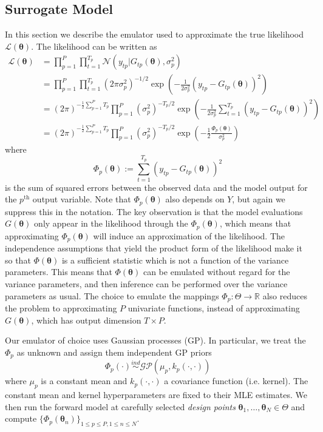 \documentclass[12pt]{article}
\newcommand{\R}{\mathbb{R}}
\newcommand{\btheta}{\boldsymbol{\theta}}
\begin{document}
\subsection{Surrogate Model}
In this section we describe the emulator used to approximate the true likelihood $\mathcal{L}(\btheta)$. The likelihood can be written as 
\begin{align*}
\mathcal{L}(\btheta) &= \prod_{p = 1}^{P} \prod_{t = 1}^{T_p} \mathcal{N}\left(y_{tp}| G_{tp}(\btheta), \sigma_p^2 \right) \\
			       &= \prod_{p = 1}^{P}  \prod_{t = 1}^{T_p} (2\pi \sigma_p^2)^{-1/2} \exp\left(-\frac{1}{2\sigma_p^2} (y_{tp} - G_{tp}(\btheta))^2 \right) \\
			       &= (2\pi)^{-\frac{1}{2} \sum_{p = 1}^{P} T_p}  \prod_{p = 1}^{P}  (\sigma_p^2)^{-T_p/2} \exp\left(-\frac{1}{2\sigma_p^2} \sum_{t = 1}^{T_p} (y_{tp} - G_{tp}(\btheta))^2  \right) \\
			       &= (2\pi)^{-\frac{1}{2} \sum_{p = 1}^{P} T_p}  \prod_{p = 1}^{P}  (\sigma_p^2)^{-T_p/2} \exp\left(-\frac{1}{2} \frac{\Phi_p(\btheta)}{\sigma_p^2} \right)
\end{align*}
where 
\[\Phi_p(\btheta) := \sum_{t = 1}^{T_p} (y_{tp} - G_{tp}(\btheta))^2\]
is the sum of squared errors between the observed data and the model output for the $p^{\text{th}}$ output variable. Note that $\Phi_p(\btheta)$ also depends on $Y$, but again we suppress this in the notation. The key observation 
is that the model evaluations $G(\btheta)$ only appear in the likelihood through the $\Phi_p(\btheta)$, which means that approximating $\Phi_p(\btheta)$ will induce an approximation of the likelihood. The independence assumptions 
that yield the product form of the likelihood make it so that $\Phi(\btheta)$ is a sufficient statistic which is not a function of the variance parameters. This means that $\Phi(\btheta)$ can be emulated without regard for the variance parameters, 
and then inference can be performed over the variance parameters as usual. The choice to emulate the mappings $\Phi_p: \Theta \to \R$ also reduces the problem to 
approximating $P$ univariate functions, instead of approximating $G(\btheta)$, which has output dimension $T \times P$. 

Our emulator of choice uses Gaussian processes (GP). In particular, we treat the $\Phi_p$ as unknown and assign them independent GP priors
\[\Phi_p(\cdot) \overset{ind}{\sim} \mathcal{GP}(\mu_p, k_p(\cdot, \cdot))\] 
where $\mu_p$ is a constant mean and $k_p(\cdot, \cdot)$ a covariance function (i.e. kernel). The constant mean and kernel hyperparameters are fixed to their MLE estimates. We then run the forward model at carefully selected 
\textit{design points} $\btheta_1, \dots, \btheta_N \in \Theta$ and compute $\{\Phi_p(\btheta_n)\}_{1 \leq p \leq P, 1 \leq n \leq N}$. 
\end{document}
